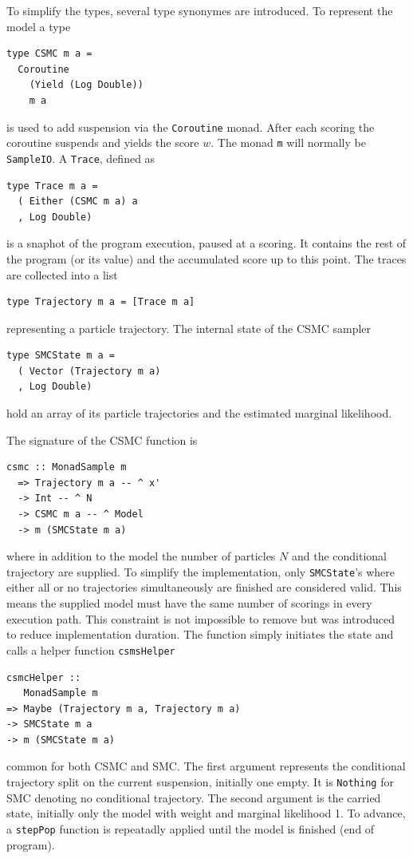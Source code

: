 To simplify the types, several type synonymes are introduced. To represent the model a type
\begin{verbatim}
type CSMC m a =
  Coroutine
    (Yield (Log Double))
    m a
\end{verbatim}
is used to add suspension via the \texttt{Coroutine} monad. After each scoring the coroutine suspends and yields the score $w$. The monad \texttt{m} will normally be \texttt{SampleIO}. A \texttt{Trace}, defined as
\begin{verbatim}
type Trace m a =
  ( Either (CSMC m a) a
  , Log Double)
\end{verbatim}
is a snaphot of the program execution, paused at a scoring. It contains the rest of the program (or its value) and the accumulated score up to this point.
The traces are collected into a list
\begin{verbatim}
type Trajectory m a = [Trace m a]
\end{verbatim}
representing a particle trajectory. The internal state of the CSMC sampler 
\begin{verbatim}
type SMCState m a =
  ( Vector (Trajectory m a)
  , Log Double)
\end{verbatim}
hold an array of its particle trajectories and the estimated marginal likelihood.

The signature of the CSMC function is
\begin{verbatim}
csmc :: MonadSample m
  => Trajectory m a -- ^ x'
  -> Int -- ^ N
  -> CSMC m a -- ^ Model
  -> m (SMCState m a)
\end{verbatim}
where in addition to the model the number of particles $N$ and the conditional trajectory are supplied. To simplify the implementation, only \texttt{SMCState}'s where either all or no trajectories simultaneously are finished are considered valid. This means the supplied model must have the same number of scorings in every execution path. This constraint is not impossible to remove but was introduced to reduce implementation duration.
The function simply initiates the state and calls a helper function \texttt{csmsHelper}
\begin{verbatim}
csmcHelper ::
   MonadSample m
=> Maybe (Trajectory m a, Trajectory m a)
-> SMCState m a
-> m (SMCState m a)
\end{verbatim}
common for both CSMC and SMC. The first argument represents the conditional trajectory split on the current suspension, initially one empty. It is \texttt{Nothing} for SMC denoting no conditional trajectory. The second argument is the carried state, initially only the model with weight and marginal likelihood 1. To advance, a \texttt{stepPop} function is repeatadly applied until the model is finished (end of program).

